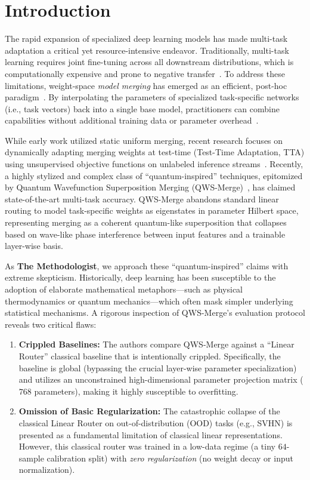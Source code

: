 \section{Introduction}
\label{sec:intro}

The rapid expansion of specialized deep learning models has made multi-task adaptation a critical yet resource-intensive endeavor. Traditionally, multi-task learning requires joint fine-tuning across all downstream distributions, which is computationally expensive and prone to negative transfer~\cite{jacobs1991adaptive}. To address these limitations, weight-space \textit{model merging} has emerged as an efficient, post-hoc paradigm~\cite{wortsman2022model}. By interpolating the parameters of specialized task-specific networks (i.e., task vectors) back into a single base model, practitioners can combine capabilities without additional training data or parameter overhead~\cite{ilharco2022editing, yadav2023ties}.

While early work utilized static uniform merging, recent research focuses on dynamically adapting merging weights at test-time (Test-Time Adaptation, TTA) using unsupervised objective functions on unlabeled inference streams~\cite{adamerging, polymerge, zipmerge}. Recently, a highly stylized and complex class of ``quantum-inspired'' techniques, epitomized by Quantum Wavefunction Superposition Merging (QWS-Merge)~\cite{qwsmerge}, has claimed state-of-the-art multi-task accuracy. QWS-Merge abandons standard linear routing to model task-specific weights as eigenstates in parameter Hilbert space, representing merging as a coherent quantum-like superposition that collapses based on wave-like phase interference between input features and a trainable layer-wise basis.

As \textbf{The Methodologist}, we approach these ``quantum-inspired'' claims with extreme skepticism. Historically, deep learning has been susceptible to the adoption of elaborate mathematical metaphors—such as physical thermodynamics or quantum mechanics—which often mask simpler underlying statistical mechanisms. A rigorous inspection of QWS-Merge's evaluation protocol reveals two critical flaws:
\begin{enumerate}
    \item \textbf{Crippled Baselines:} The authors compare QWS-Merge against a ``Linear Router'' classical baseline that is intentionally crippled. Specifically, the baseline is global (bypassing the crucial layer-wise parameter specialization) and utilizes an unconstrained high-dimensional parameter projection matrix ($768$ parameters), making it highly susceptible to overfitting.
    \item \textbf{Omission of Basic Regularization:} The catastrophic collapse of the classical Linear Router on out-of-distribution (OOD) tasks (e.g., SVHN) is presented as a fundamental limitation of classical linear representations. However, this classical router was trained in a low-data regime (a tiny $64$-sample calibration split) with \textit{zero regularization} (no weight decay or input normalization). 
\end{enumerate}

